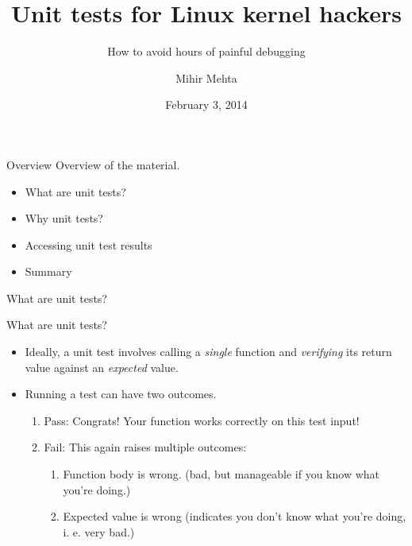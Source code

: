 \documentclass{beamer}
\title{Unit tests for Linux kernel hackers}
\subtitle{How to avoid hours of painful debugging}
\author{Mihir Mehta}
\institute{
  Systems Core Group\\
  Samsung Research Institute - Noida\\[1ex]
  \texttt{mihir.mehta@samsung.com}
}
\date{February 3, 2014}
\begin{document}
\begin{frame}[plain]
  \titlepage
\end{frame}

\begin{frame}{Overview}
  Overview of the material.
  \begin{itemize}

  \item What are unit tests?
  \item Why unit tests?
  \item Accessing unit test results
  \item Summary

  \end{itemize}
\end{frame}

\begin{frame}{What are unit tests?}

\end{frame}

\begin{frame}{What are unit tests?}

  \begin{itemize}

  \item Ideally, a unit test involves calling a \textit{single} function
    and \textit{verifying} its return value against an
    \textit{expected} value.
  \item Running a test can have two outcomes.
    \begin{enumerate}
    \item Pass: Congrats! Your function works correctly on this test
      input!
    \item Fail: This again raises multiple outcomes:
      \begin{enumerate}
      \item Function body is wrong. (bad, but manageable if you know
        what you're doing.)
      \item Expected value is wrong (indicates you don't know what
        you're doing, i. e. very bad.)
      \end{enumerate}
    \end{enumerate}

  \end{itemize}

\end{frame}
\end{document}
